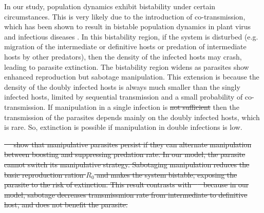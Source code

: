 \documentclass[a4paper]{scrartcl}
\providecommand{\DIFaddtex}[1]{{\protect\color{blue}\uwave{#1}}} %
\providecommand{\DIFdeltex}[1]{{\protect\color{red}\sout{#1}}}                      %
\providecommand{\DIFaddbegin}{} %
\providecommand{\DIFaddend}{} %
\providecommand{\DIFdelbegin}{} %
\providecommand{\DIFdelend}{} %
\providecommand{\DIFadd}[1]{\texorpdfstring{\DIFaddtex{#1}}{#1}} %
\providecommand{\DIFdel}[1]{\texorpdfstring{\DIFdeltex{#1}}{}} %
\newcommand{\DIFscaledelfig}{0.5}
\newlength{\DIFdelgraphicswidth} %
\newlength{\DIFdelgraphicsheight} %
\newcommand{\DIFaddincludegraphics}[2][]{{\color{blue}\fbox{\DIFOincludegraphics[#1]{#2}}}} %
\newcommand{\DIFdelincludegraphics}[2][]{%
\sbox{\DIFdelgraphicsbox}{\DIFOincludegraphics[#1]{#2}}%
\settoboxwidth{\DIFdelgraphicswidth}{\DIFdelgraphicsbox} %
\settoboxtotalheight{\DIFdelgraphicsheight}{\DIFdelgraphicsbox} %
\scalebox{\DIFscaledelfig}{%
\parbox[b]{\DIFdelgraphicswidth}{\usebox{\DIFdelgraphicsbox}\\[-\baselineskip] \rule{\DIFdelgraphicswidth}{0em}}\llap{\resizebox{\DIFdelgraphicswidth}{\DIFdelgraphicsheight}{%
\setlength{\unitlength}{\DIFdelgraphicswidth}%
\begin{picture}(1,1)%
\thicklines\linethickness{2pt} %
{\color[rgb]{1,0,0}\put(0,0){\framebox(1,1){}}}%
{\color[rgb]{1,0,0}\put(0,0){\line( 1,1){1}}}%
{\color[rgb]{1,0,0}\put(0,1){\line(1,-1){1}}}%
\end{picture}%
}\hspace*{3pt}}} %
} %
\DeclareRobustCommand{\DIFaddbegin}{\DIFOaddbegin \let\includegraphics\DIFaddincludegraphics} %
\DeclareRobustCommand{\DIFaddend}{\DIFOaddend \let\includegraphics\DIFOincludegraphics} %
\DeclareRobustCommand{\DIFdelbegin}{\DIFOdelbegin \let\includegraphics\DIFdelincludegraphics} %
\DeclareRobustCommand{\DIFdelend}{\DIFOaddend \let\includegraphics\DIFOincludegraphics} %
\begin{document}
\DIFaddend In our study, population dynamics exhibit bistability under certain circumstances. 
This is very likely due to the introduction of co-transmission, which has been shown to result in bistable population dynamics in plant virus \cite{allen_modelling_2019} and infectious diseases \cite{gao_coinfection_2016-1}.
 In this bistability region, if the system is disturbed (e.g. migration of the intermediate or definitive hosts or predation of intermediate hosts by other predators), then the density of the infected hosts may crash, leading to parasite extinction. 
The bistability region widens as parasites show enhanced reproduction but sabotage manipulation. 
This extension is because the density of the doubly infected hosts is always much smaller than the singly infected hosts, limited by sequential transmission and a small probability of co-transmission. 
If manipulation in a single infection is \DIFdelbegin \DIFdel{not sufficient }\DIFdelend \DIFaddbegin \DIFadd{insufficient, }\DIFaddend then the transmission of the parasites depends mainly on the doubly infected hosts, which is rare. 
So, extinction is possible if manipulation in double infections is low.

\DIFdelbegin \DIFdel{\mbox{%
\cite{Iritani2018} }\hspace{0pt}%
show that manipulative parasites persist if they can alternate manipulation between boosting and suppressing predation rate. 
In our model, the parasite cannot switch its manipulative strategy. 
Sabotaging manipulation reduces the basic reproduction ration $R_0$ and makes the system bistable, exposing the parasite to the risk of extinction. This result contrasts with \mbox{%
\cite{Iritani2018} }\hspace{0pt}%
because in our model, sabotage decreases transmissmion rate from intermediate to definitive host, and does not benefit the parasite.
}%
\end{document}
